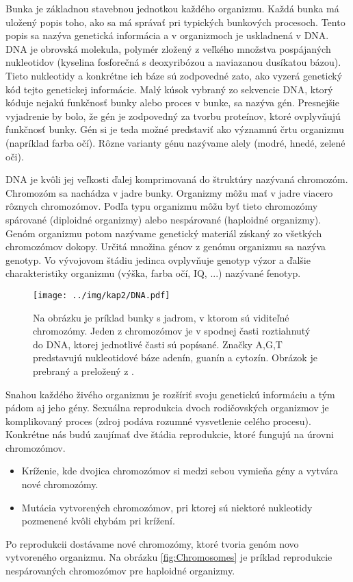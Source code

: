 Bunka je základnou stavebnou jednotkou každého organizmu. Každá bunka má uložený popis toho, ako sa má správať pri typických bunkových procesoch. Tento popis sa nazýva genetická informácia a v organizmoch je uskladnená v DNA. DNA je obrovská molekula, polymér zložený z veľkého množstva pospájaných nukleotidov (kyselina fosforečná s deoxyribózou a naviazanou dusíkatou bázou). Tieto nukleotidy a konkrétne ich báze sú zodpovedné zato, ako vyzerá genetický kód tejto genetickej informácie. Malý kúsok vybraný zo sekvencie DNA, ktorý kóduje nejakú funkčnosť bunky alebo proces v bunke, sa nazýva gén. Presnejšie vyjadrenie by bolo, že gén je zodpovedný za tvorbu proteínov, ktoré ovplyvňujú funkčnosť bunky. Gén si je teda možné predstaviť ako významnú črtu organizmu (napríklad farba očí). Rôzne varianty génu nazývame alely (modré, hnedé, zelené oči).

DNA je kvôli jej veľkosti ďalej komprimovaná do štruktúry nazývaná chromozóm. Chromozóm sa nachádza v jadre bunky. Organizmy môžu mať v jadre viacero rôznych chromozómov. Podľa typu organizmu môžu byť tieto chromozómy spárované (diploidné organizmy) alebo nespárované (haploidné organizmy). Genóm organizmu potom nazývame genetický materiál získaný zo všetkých chromozómov dokopy. Určitá množina génov z genómu organizmu sa nazýva genotyp. Vo vývojovom štádiu jedinca ovplyvňuje genotyp výzor a ďalšie charakteristiky organizmu (výška, farba očí, IQ, ...) nazývané fenotyp.

\begin{figure}[h]
\centering
\centerline{\mbox{\texttt{[image: ../img/kap2/DNA.pdf]}}}
\caption{Na obrázku je príklad bunky s jadrom, v ktorom sú viditeľné chromozómy. Jeden z chromozómov je v spodnej časti roztiahnutý do DNA, ktorej jednotlivé časti sú popísané. Značky A,G,T predstavujú nukleotidové báze adenín, guanín a cytozín. Obrázok je prebraný a preložený z \cite{online-geneticsoverview}.}\label{fig:DNA}
\end{figure}

Snahou každého živého organizmu je rozšíriť svoju genetickú informáciu a tým pádom aj jeho gény. Sexuálna reprodukcia dvoch rodičovských organizmov je komplikovaný proces (zdroj \cite{online-shuffling} podáva rozumné vysvetlenie celého procesu). Konkrétne nás budú zaujímať dve štádia reprodukcie, ktoré fungujú na úrovni chromozómov.
\begin{itemize}
\item Kríženie, kde dvojica chromozómov si medzi sebou vymieňa gény a vytvára nové chromozómy.
\item Mutácia vytvorených chromozómov, pri ktorej sú niektoré nukleotidy pozmenené kvôli chybám pri krížení.
\end{itemize}
Po reprodukcii dostávame nové chromozómy, ktoré tvoria genóm novo vytvoreného organizmu. Na obrázku \ref{fig:Chromosomes} je príklad reprodukcie nespárovaných chromozómov pre haploidné organizmy.

